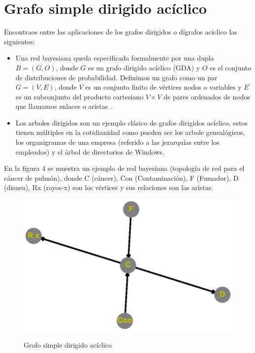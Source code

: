 \documentclass{article}
\begin{document}
\section{Grafo simple dirigido acíclico}
Encontraos entre las aplicaciones de los grafos dirigidos o dígrafos acíclico las siguientes: 
\begin{itemize}
\item Una red bayesiana queda especificada formalmente por una dupla $B= (G, O)$, donde $G$ es un grafo dirigido acíclico (GDA) y $O$ es el conjunto de distribuciones de probabilidad. Definimos un grafo como un par $G= (V, E)$, donde $V$ es un conjunto finito de vértices nodos o variables y $E$ es un subconjunto del producto cartesiano $V \times V$ de pares ordenados de nodos que llamamos enlaces o aristas \cite{gf2}.
\item Los arboles dirigidos son un ejemplo clásico de grafos dirigidos acíclico, estos tienen múltiples en la cotidianidad como pueden ser los arbole genealógicos, los organigramas de una empresa (referido a las jerarquías entre los empleados) y el árbol de directorios de Windows.

\end{itemize}	
En la figura 4 se muestra un ejemplo de red bayesiana (topología de red para el cáncer de pulmón), donde C (cáncer), Con (Contaminación), F (Fumador), D (disnea), Rx (rayos-x) son los vértices y sus relaciones son las aristas.

\begin{center}

\end{center}

\begin{figure}[h]
\begin{center}
\includegraphics[scale=0.7]{Graf4.eps}\\
\caption{Grafo simple dirigido acíclico}
\end{center}

\end{figure}
\end{document}
